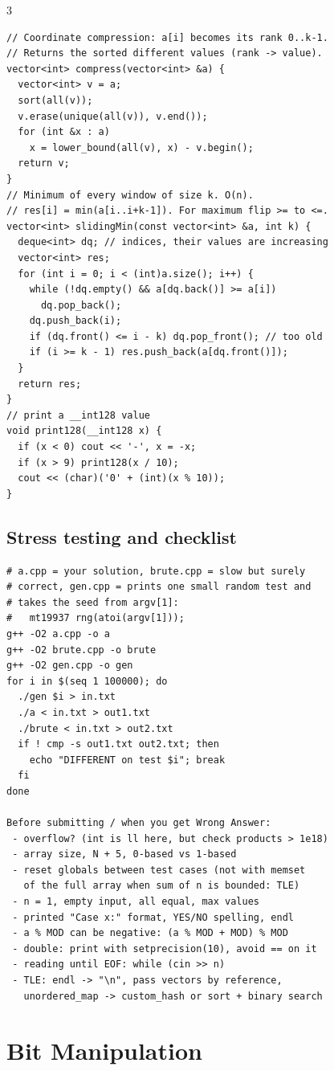 \documentclass[8pt, a4paper]{article}
\begin{document}
\begin{multicols*}{3}
\begin{lstlisting}
// Coordinate compression: a[i] becomes its rank 0..k-1.
// Returns the sorted different values (rank -> value).
vector<int> compress(vector<int> &a) {
  vector<int> v = a;
  sort(all(v));
  v.erase(unique(all(v)), v.end());
  for (int &x : a)
    x = lower_bound(all(v), x) - v.begin();
  return v;
}
// Minimum of every window of size k. O(n).
// res[i] = min(a[i..i+k-1]). For maximum flip >= to <=.
vector<int> slidingMin(const vector<int> &a, int k) {
  deque<int> dq; // indices, their values are increasing
  vector<int> res;
  for (int i = 0; i < (int)a.size(); i++) {
    while (!dq.empty() && a[dq.back()] >= a[i])
      dq.pop_back();
    dq.push_back(i);
    if (dq.front() <= i - k) dq.pop_front(); // too old
    if (i >= k - 1) res.push_back(a[dq.front()]);
  }
  return res;
}
// print a __int128 value
void print128(__int128 x) {
  if (x < 0) cout << '-', x = -x;
  if (x > 9) print128(x / 10);
  cout << (char)('0' + (int)(x % 10));
}
\end{lstlisting}
\subsection{Stress testing and checklist}
\begin{lstlisting}[language={}]
# a.cpp = your solution, brute.cpp = slow but surely
# correct, gen.cpp = prints one small random test and
# takes the seed from argv[1]:
#   mt19937 rng(atoi(argv[1]));
g++ -O2 a.cpp -o a
g++ -O2 brute.cpp -o brute
g++ -O2 gen.cpp -o gen
for i in $(seq 1 100000); do
  ./gen $i > in.txt
  ./a < in.txt > out1.txt
  ./brute < in.txt > out2.txt
  if ! cmp -s out1.txt out2.txt; then
    echo "DIFFERENT on test $i"; break
  fi
done

Before submitting / when you get Wrong Answer:
 - overflow? (int is ll here, but check products > 1e18)
 - array size, N + 5, 0-based vs 1-based
 - reset globals between test cases (not with memset
   of the full array when sum of n is bounded: TLE)
 - n = 1, empty input, all equal, max values
 - printed "Case x:" format, YES/NO spelling, endl
 - a % MOD can be negative: (a % MOD + MOD) % MOD
 - double: print with setprecision(10), avoid == on it
 - reading until EOF: while (cin >> n)
 - TLE: endl -> "\n", pass vectors by reference,
   unordered_map -> custom_hash or sort + binary search
\end{lstlisting}
\section{Bit Manipulation}

\end{multicols*}
\end{document}
